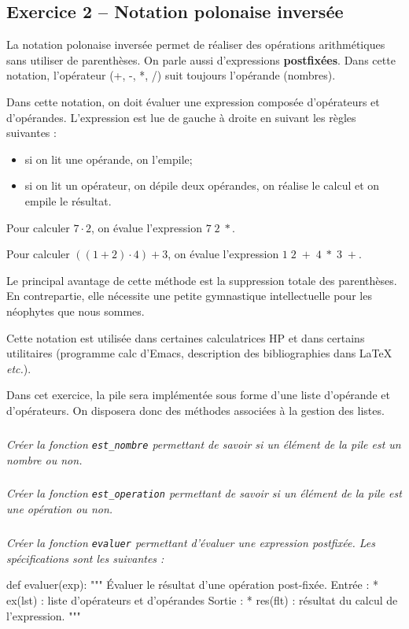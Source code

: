 \documentclass[10pt,fleqn]{article} %
\begin{document}
\begin{multicols}{2}
\section*{Exercice 2 -- Notation polonaise inversée}
\setcounter{exo}{0}
La notation polonaise inversée permet de réaliser des opérations arithmétiques sans utiliser de parenthèses. On parle aussi d'expressions \textbf{postfixées}. Dans cette notation, l'opérateur (+, -, *, /) suit toujours l'opérande (nombres).

Dans cette notation, on doit évaluer une expression composée d'opérateurs et d'opérandes. L'expression est lue de gauche à droite en suivant les règles suivantes :
\begin{itemize}
\item si on lit une opérande, on l'empile;
\item si on lit un opérateur, on dépile deux opérandes, on réalise le calcul et on empile le résultat. 
\end{itemize}
\begin{exemple}
Pour calculer $7\cdot 2$, on évalue l'expression $7\;2\; *$.

Pour calculer $((1 + 2) \cdot 4) + 3$, on évalue l'expression $1\;2\;+\;4\;*\;3\;+$.
\end{exemple} 


\begin{rem}
Le principal avantage de cette méthode est la suppression totale des parenthèses. En contrepartie, elle nécessite une petite gymnastique intellectuelle pour les néophytes que nous sommes.

Cette notation est utilisée dans certaines calculatrices HP et dans certains utilitaires (programme calc d'Emacs, description des bibliographies dans LaTeX \textit{etc.}).
\end{rem}

Dans cet exercice, la pile sera implémentée sous forme d'une liste d'opérande et d'opérateurs. On disposera donc des méthodes associées à la gestion des listes. 
\subparagraph{}\textit{Créer la fonction \texttt{est\_nombre} permettant de savoir si un élément de la pile est un nombre ou non.}
\subparagraph{}\textit{Créer la fonction \texttt{est\_operation} permettant de savoir si un élément de la pile est une opération ou non.}
\subparagraph{}\textit{Créer la fonction \texttt{evaluer} permettant d'évaluer une expression postfixée. Les spécifications sont les suivantes :}
\begin{py}
\begin{python}
def evaluer(exp):
    """
    Évaluer le résultat d'une opération post-fixée.
    Entrée : 
     * ex(lst) : liste d'opérateurs et d'opérandes
    Sortie : 
     * res(flt) : résultat du calcul de l'expression.
    """
\end{python}
\end{py}


\end{multicols}
\end{document}
